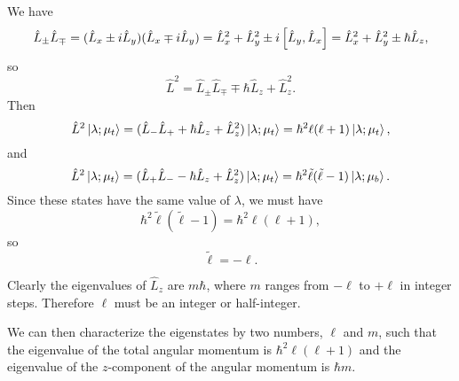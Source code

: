 We have 
\begin{equation*}
    \hat{L}_\pm \hat{L}_\mp = (\hat{L}_x \pm i\hat{L}_y) (\hat{L}_x \mp i \hat{L}_y) = \hat{L}_x^2 + \hat{L}_y^2 \pm i \left[\hat{L}_y, \hat{L}_x\right] = \hat{L}_x^2 + \hat{L}_y^2 \pm \hbar \hat{L}_z,
\end{equation*}
so 
\begin{equation*}
    \hat{L}^2 = \hat{L}_\pm \hat{L}_\mp  \mp \hbar \hat{L}_z + \hat{L}_z^2.
\end{equation*}
Then 
\begin{equation*}
    \hat{L}^2 \left| \lambda; \mu_t \right\rangle = (\hat{L}_- \hat{L}_+ + \hbar \hat{L}_z + \hat{L}^2_z) \left| \lambda; \mu_t \right\rangle = \hbar^2 \ell (\ell + 1) \left| \lambda; \mu_t \right\rangle,
\end{equation*} and
\begin{equation*}
    \hat{L}^2 \left| \lambda; \mu_t \right\rangle = (\hat{L}_+ \hat{L}_- - \hbar \hat{L}_z + \hat{L}^2_z) \left| \lambda; \mu_t \right\rangle = \hbar^2 \tilde{\ell} (\tilde{\ell} - 1) \left| \lambda; \mu_b \right\rangle.
\end{equation*}
Since these states have the same value of $\lambda$, we must have 
\begin{equation}\hbar^2 \tilde{\ell} (\tilde{\ell} - 1) = \hbar^2 \ell (\ell + 1),\end{equation} so \begin{equation}\tilde{\ell} = -\ell.\end{equation}

Clearly the eigenvalues of $\hat{L}_z$ are $m\hbar$, where $m$ ranges from $-\ell$ to $+\ell$ in integer steps. Therefore $\ell$ must be an integer or half-integer.

We can then characterize the eigenstates by two numbers, $\ell$ and $m$, such that the eigenvalue of the total angular momentum is $\hbar^2 \ell (\ell+1)$ and the eigenvalue of the $z$-component of the angular momentum is $\hbar m$.
